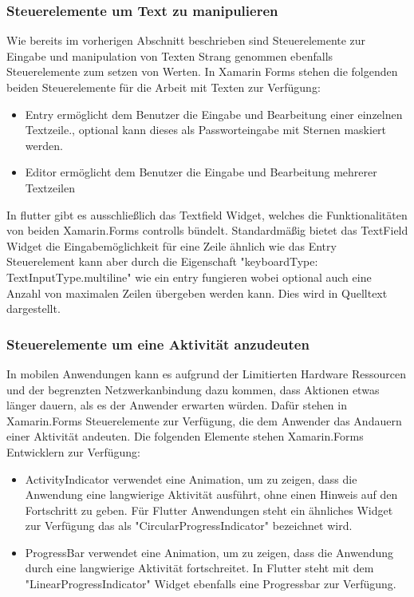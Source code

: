 \subsubsection{Steuerelemente um Text zu manipulieren}
Wie bereits im vorherigen Abschnitt beschrieben sind Steuerelemente zur Eingabe und manipulation von Texten Strang genommen ebenfalls Steuerelemente zum setzen von Werten.  In Xamarin Forms stehen die folgenden beiden Steuerelemente für die Arbeit mit Texten zur Verfügung:
\begin{itemize}
\setlength\itemsep{-0.6em}
 \item Entry ermöglicht dem Benutzer die Eingabe und Bearbeitung einer einzelnen Textzeile., optional kann dieses als Passworteingabe mit Sternen maskiert werden.
 \item Editor ermöglicht dem Benutzer die Eingabe und Bearbeitung mehrerer Textzeilen
\end{itemize}

In flutter gibt es ausschließlich das Textfield Widget, welches die Funktionalitäten von beiden Xamarin.Forms controlls bündelt.  Standardmäßig bietet das TextField Widget die Eingabemöglichkeit für eine Zeile ähnlich wie das Entry Steuerelement kann aber durch die Eigenschaft "keyboardType: TextInputType.multiline" wie ein entry fungieren wobei optional auch eine Anzahl von maximalen Zeilen übergeben werden kann.  Dies wird in Quelltext dargestellt.

 \begin{minipage}{\linewidth}

\end{minipage}


\subsubsection{Steuerelemente um eine Aktivität anzudeuten}

In mobilen Anwendungen kann es aufgrund der Limitierten Hardware Ressourcen und der begrenzten Netzwerkanbindung dazu kommen, dass Aktionen etwas länger dauern,  als es der Anwender erwarten würden.  Dafür stehen in Xamarin.Forms Steuerelemente zur Verfügung, die dem Anwender das Andauern einer Aktivität andeuten.  Die folgenden Elemente stehen Xamarin.Forms Entwicklern zur Verfügung:

\begin{itemize}
\setlength\itemsep{-0.6em}
 \item ActivityIndicator verwendet eine Animation, um zu zeigen, dass die Anwendung eine langwierige Aktivität ausführt, ohne einen Hinweis auf den Fortschritt zu geben.  Für Flutter Anwendungen steht ein ähnliches Widget zur Verfügung das als "CircularProgressIndicator" bezeichnet wird. 
 \item ProgressBar verwendet eine Animation, um zu zeigen, dass die Anwendung durch eine langwierige Aktivität fortschreitet. In Flutter steht mit dem "LinearProgressIndicator" Widget ebenfalls eine Progressbar zur Verfügung.
\end{itemize}

